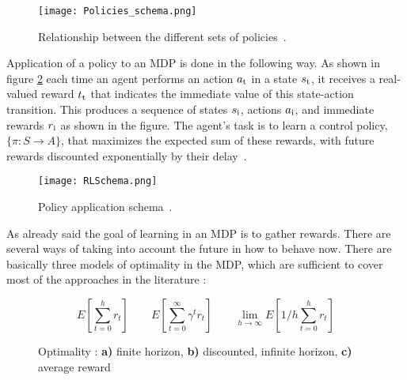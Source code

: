 \begin{figure}[h!]
	\centering
	\texttt{[image: Policies\_schema.png]}
	\caption{Relationship between the different sets of policies~\cite{Sigaud:2010:MDP:1841781}.}
	\label{fig:Policies_schema}
\end{figure}

Application of a policy to an MDP is done in the following way. As shown in figure \ref{fig:Policy_application_schema} each time an agent performs an action $a\textsubscript{t}$ in a state $s\textsubscript{t}$, it receives a real-valued reward $t\textsubscript{t}$ that indicates the immediate value of this state-action transition. This produces a sequence of states $s\textsubscript{i}$, actions $a\textsubscript{i}$, and immediate rewards $r\textsubscript{i}$ as shown in the figure. The agent's task is to learn a control policy, $\{\pi : S \longrightarrow A\}$, that maximizes the expected sum of these rewards, with future rewards discounted exponentially by their delay~\cite{Mitchell}.

\begin{figure}[h!]
	\centering
	\texttt{[image: RLSchema.png]}
	\caption{Policy application schema~\cite{SuttonBarto}.}
	\label{fig:Policy_application_schema}
\end{figure}

As already said the goal of learning in an MDP is to gather rewards. There are several ways of taking into account the future in how to behave now. There are basically three models of optimality in the MDP, which are sufficient to cover most of the approaches in the literature :

\begin{figure}[h!]
\begin{equation*}
E[\sum_{t = 0}^h r_t]
\qquad
E[\sum_{t = 0}^\infty \gamma^t r_t]
\qquad
\lim\limits_{h \rightarrow \infty} E[1/h \sum_{t = 0}^h r_t]
\end{equation*}
\caption{Optimality : \textbf{a)} finite horizon, \textbf{b)} discounted, infinite horizon, \textbf{c)} average reward}
\end{figure}

